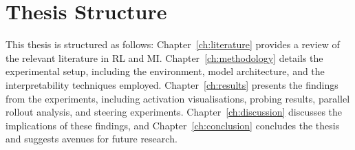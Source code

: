 \section{Thesis Structure}\label{sec:structure}
This thesis is structured as follows: Chapter~\ref{ch:literature} provides a review of the relevant literature in RL and MI. Chapter~\ref{ch:methodology} details the experimental setup, including the environment, model architecture, and the interpretability techniques employed. Chapter~\ref{ch:results} presents the findings from the experiments, including activation visualisations, probing results, parallel rollout analysis, and steering experiments. Chapter~\ref{ch:discussion} discusses the implications of these findings, and Chapter~\ref{ch:conclusion} concludes the thesis and suggests avenues for future research.